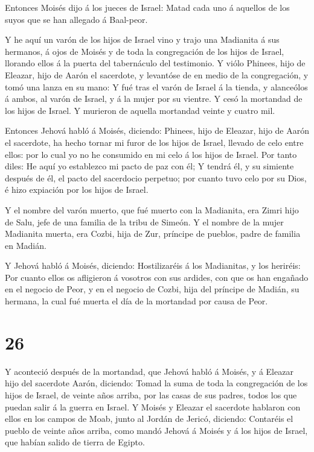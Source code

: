  Entonces Moisés dijo á los jueces de Israel: Matad cada uno
á aquellos de los suyos que se han allegado á Baal-peor.

 Y he aquí un varón de los hijos de Israel vino y trajo una
Madianita á sus hermanos, á ojos de Moisés y de toda la congregación de
los hijos de Israel, llorando ellos á la puerta del tabernáculo del
testimonio.  Y viólo Phinees, hijo de Eleazar, hijo de Aarón
el sacerdote, y levantóse de en medio de la congregación, y tomó una
lanza en su mano:  Y fué tras el varón de Israel á la
tienda, y alanceólos á ambos, al varón de Israel, y á la mujer por su
vientre. Y cesó la mortandad de los hijos de Israel.  Y
murieron de aquella mortandad veinte y cuatro mil.

 Entonces Jehová habló á Moisés, diciendo: 
Phinees, hijo de Eleazar, hijo de Aarón el sacerdote, ha hecho tornar mi
furor de los hijos de Israel, llevado de celo entre ellos: por lo cual
yo no he consumido en mi celo á los hijos de Israel.  Por
tanto diles: He aquí yo establezco mi pacto de paz con él; 
Y tendrá él, y su simiente después de él, el pacto del sacerdocio
perpetuo; por cuanto tuvo celo por su Dios, é hizo expiación por los
hijos de Israel.

 Y el nombre del varón muerto, que fué muerto con la
Madianita, era Zimri hijo de Salu, jefe de una familia de la tribu de
Simeón.  Y el nombre de la mujer Madianita muerta, era
Cozbi, hija de Zur, príncipe de pueblos, padre de familia en Madián.

 Y Jehová habló á Moisés, diciendo: 
Hostilizaréis á los Madianitas, y los heriréis:  Por cuanto
ellos os afligieron á vosotros con sus ardides, con que os han engañado
en el negocio de Peor, y en el negocio de Cozbi, hija del príncipe de
Madián, su hermana, la cual fué muerta el día de la mortandad por causa
de Peor.

\hypertarget{section-25}{%
\section{26}\label{section-25}}

 Y aconteció después de la mortandad, que Jehová habló á
Moisés, y á Eleazar hijo del sacerdote Aarón, diciendo: 
Tomad la suma de toda la congregación de los hijos de Israel, de veinte
años arriba, por las casas de sus padres, todos los que puedan salir á
la guerra en Israel.  Y Moisés y Eleazar el sacerdote
hablaron con ellos en los campos de Moab, junto al Jordán de Jericó,
diciendo:  Contaréis el pueblo de veinte años arriba, como
mandó Jehová á Moisés y á los hijos de Israel, que habían salido de
tierra de Egipto.

